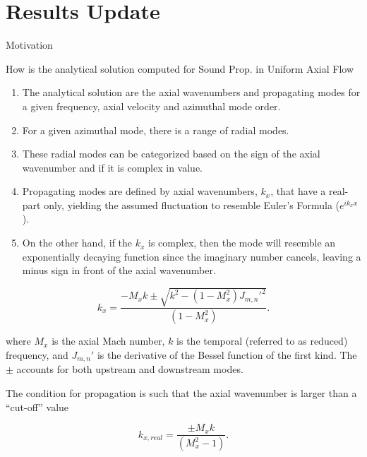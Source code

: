 
\section{Results Update}
\frame{\sectionpage}

\begin{frame}{Motivation}
    \begin{alertblock}{How is the analytical solution computed for Sound Prop. in Uniform Axial Flow}
    \begin{enumerate}[<+->]\itemsep9pt
        \item The analytical solution are the axial wavenumbers and propagating
            modes for a given frequency, axial velocity and azimuthal mode order.
        \item For a given azimuthal mode, there is a range of radial modes.
        \item These radial modes can be categorized based on the sign of the axial wavenumber and if it is
            complex in value. 
        \item Propagating modes are defined by axial wavenumbers, $k_x$, that have a real-part only, yielding 
            the assumed fluctuation to resemble Euler's Formula ($e^{ik_x x}$). 
        \item On the other hand, if the $k_x$ is complex, then the mode will resemble an exponentially decaying
            function since the imaginary number cancels, leaving a minus sign in front of
            the axial wavenumber.
    \end{enumerate}
    \end{alertblock}

    \tiny
\end{frame}
\begin{frame}

\begin{equation}
    k_x  = \frac{- M_x k \pm \sqrt{k^2 - ( 1 - M_x^2) J_{m,n}'^2 }}{\left( 1 - M_x^2 \right)}.
    \label{eqn:ax_wavenumb}
\end{equation}

where $M_x$ is the axial Mach number, $k$ is the temporal (referred to as reduced)
frequency, and $J_{m,n}'$ is the derivative of the Bessel function of the first kind.  
The $\pm$ accounts for both upstream and downstream modes.

The condition for propagation is such that the axial wavenumber is larger than 
a ``cut-off'' value

\begin{equation}
    k_{x,real}  = \frac{\pm M_x k }{\left( M_x^2 - 1 \right)}.
    \label{eqn:cuton}
\end{equation}


\end{frame}
